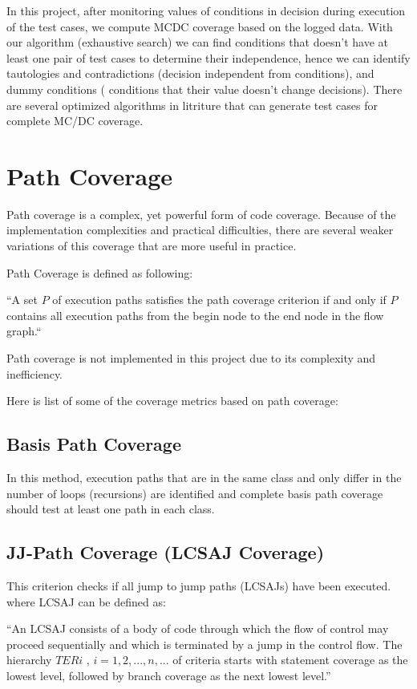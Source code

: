 \documentclass[12pt,a4paper]{report}
\begin{document}
In this project, after monitoring values of conditions in decision during execution of the test cases, we compute MCDC coverage based on the logged data.
 With our algorithm (exhaustive search) we can find conditions that doesn’t have at least one pair of test cases to determine their independence, hence we
 can identify tautologies and contradictions (decision independent from conditions), and dummy conditions ( conditions that their value doesn’t change
 decisions). There are several optimized algorithms in litriture that can generate test cases for complete MC/DC coverage.

\section{Path Coverage}
Path coverage is a complex, yet powerful form of code coverage. Because of the implementation complexities and practical difficulties, there are several
 weaker variations of this coverage that are more useful in practice. 

Path Coverage is defined as following:

“A set $P$ of execution paths satisfies the path coverage criterion if and only if $P$ contains all execution paths from the begin node to the end node in
 the flow graph.“\cite{Zhu:1997:SUT:267580.267590}

Path coverage is not implemented in this project due to its complexity and inefficiency. 

Here is list of some of the coverage metrics based on path coverage:
\subsection{Basis Path Coverage}
In this method, execution paths that are in the same class and only differ in the number of loops (recursions) are identified and complete basis path
 coverage should test at least one path in each class.

\subsection{JJ-Path Coverage (LCSAJ Coverage)}
This criterion checks if all jump to jump paths (LCSAJs) have been executed.
where LCSAJ can be defined as:

“An LCSAJ consists of a body of code through which the flow of control may proceed sequentially and which is terminated by a jump in the control flow. The
 hierarchy $TERi$ , $i = 1, 2, . . . ,n, . . .$ of criteria starts with statement coverage as the lowest level, followed by branch coverage as the next
 lowest level.”\cite{Zhu:1997:SUT:267580.267590}
\end{document}
